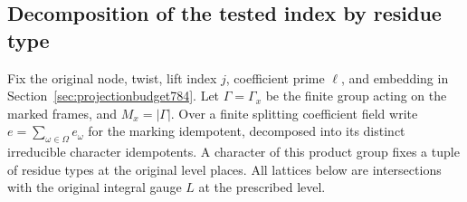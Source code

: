 \documentclass[a4paper,11pt]{article}
\theoremstyle{definition}
\theoremstyle{remark}
\numberwithin{equation}{section}
\begin{document}
\subsection{Decomposition of the tested index by residue type}
\label{sec:typedindices799}
Fix the original node, twist, lift index \(j\), coefficient
prime \(\ell\), and embedding in Section~\ref{sec:projectionbudget784}.
Let \(\Gamma=\Gamma_x\) be the finite group acting on the
marked frames, and \(M_x=|\Gamma|\). Over a finite splitting
coefficient field write \(e=\sum_{\omega\in\Omega} e_\omega\)
for the marking idempotent, decomposed into its distinct
irreducible character idempotents. A character of this
product group fixes a tuple of residue types at the original
level places. All lattices below are intersections with the
original integral gauge \(L\) at the prescribed level.
\end{document}
